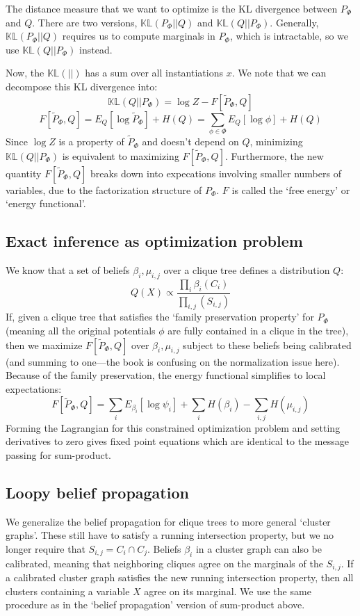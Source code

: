 \documentclass[11pt]{article}
\newcommand{\KL}[2]{\mathbb{KL}\left(#1||#2\right)}
\begin{document}
The distance measure that we want to optimize is the KL divergence between $P_\Phi$ and $Q$. There are two versions, $\KL{P_\Phi}{Q}$ and $\KL{Q}{P_\Phi}$. Generally, $\KL{P_\Phi}{Q}$ requires us to compute marginals in $P_\Phi$, which is intractable, so we use $\KL{Q}{P_\Phi}$ instead.

Now, the $\KL{}{}$ has a sum over all instantiations $x$. We note that we can decompose this KL divergence into:
\[ \KL{Q}{P_\Phi} = \log Z - F[\tilde{P}_\Phi, Q] \]
\[ F[\tilde{P}_\Phi, Q] = E_Q[\log \tilde{P}_\Phi] + H(Q) = \sum_{\phi \in \Phi} E_Q[\log \phi] + H(Q)\]
Since $\log Z$ is a property of $\tilde{P}_{\Phi}$ and doesn't depend on $Q$, minimizing $\KL{Q}{P_\Phi}$ is equivalent to maximizing $F[\tilde{P}_\Phi,Q]$. Furthermore, the new quantity $F[\tilde{P}_\Phi,Q]$ breaks down into expecations involving smaller numbers of variables, due to the factorization structure of $P_\Phi$. $F$ is called the `free energy' or `energy functional'.

\subsection*{Exact inference as optimization problem}
We know that a set of beliefs $\beta_i, \mu_{i,j}$ over a clique tree defines a distribution $Q$:
\[ Q(X) \propto \frac{\prod_i \beta_i(C_i)}{\prod_{i,j}(S_{i,j})} \]
If, given a clique tree that satisfies the `family preservation property' for $P_\Phi$ (meaning all the original potentials $\phi$ are fully contained in a clique in the tree), then we maximize $F[\tilde{P}_\Phi,Q]$ over $\beta_i,\mu_{i,j}$ subject to these beliefs being calibrated (and summing to one---the book is confusing on the normalization issue here). Because of the family preservation, the energy functional simplifies to local expectations:
\[ F[\tilde{P}_\Phi,Q] = \sum_i E_{\beta_i}[\log \psi_i] + \sum_i H(\beta_i) - \sum_{i,j} H(\mu_{i,j})\]
Forming the Lagrangian for this constrained optimization problem and setting derivatives to zero gives fixed point equations which are identical to the message passing for sum-product.

\subsection*{Loopy belief propagation}
We generalize the belief propagation for clique trees to more general `cluster graphs'. These still have to satisfy a running intersection property, but we no longer require that $S_{i,j} = C_i \cap C_j$. Beliefs $\beta_i$ in a cluster graph can also be calibrated, meaning that neighboring cliques agree on the marginals of the $S_{i,j}$. If a calibrated cluster graph satisfies the new running intersection property, then all clusters containing a variable $X$ agree on its marginal. We use the same procedure as in the `belief propagation' version of sum-product above.
\end{document}
